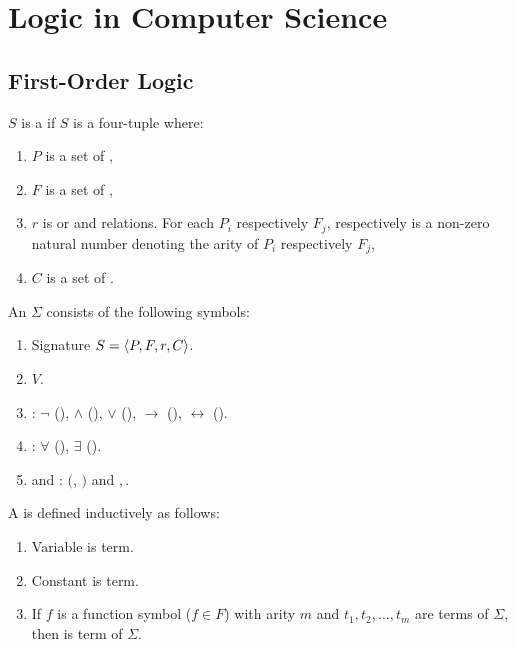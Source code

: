 \chapter{Logic in Computer Science}

\section{First-Order Logic}

\begin{defi}[Signature]
$S$ is a  if $S$ is a four-tuple  where:
\begin{enumerate}
\item $P$ is a set of  ,
\item $F$ is a set of  ,
\item $r$ is  or  and relations. For each $P_i$ respectively $F_j$,  respectively  is a non-zero natural number denoting the arity of $P_i$ respectively $F_j$,
\item $C$ is a set of .
\end{enumerate}
\cite{conf/fedcsis/Telnarova12}
\end{defi}

\begin{defi}[Alphabet]
An  $\Sigma$ consists of the following symbols:
\begin{enumerate}
\item Signature $S=\left\langle P,F,r,C\right\rangle$.
\item {} $V$.
\item {}: $\neg$ (), $\wedge$ (), $\vee$ (), $\rightarrow$ (), $\leftrightarrow$ ().
\item {}: $\forall$ (), $\exists$ ().
\item {} and : $($, $)$ and $,$.
\end{enumerate}
\cite{conf/fedcsis/Telnarova12}
\end{defi}

\begin{defi}[Term]
A  is defined inductively as follows:
\begin{enumerate}
\item Variable is term.
\item Constant is term.
\item If $f$ is a function symbol ($f\in F$) with arity $m$ and $t_1,t_2,\ldots,t_m$ are terms of $\Sigma$, then  is term of $\Sigma$.
\end{enumerate}
\cite{conf/fedcsis/Telnarova12}
\end{defi}

